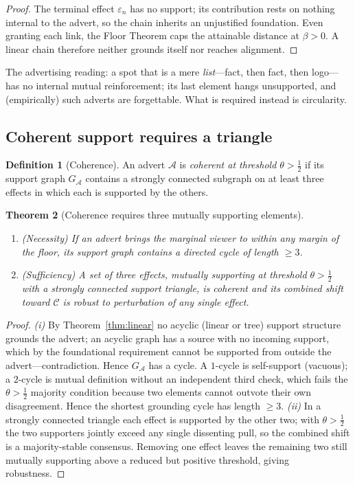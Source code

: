 \documentclass[twocolumn,11pt,a4paper]{article}
\theoremstyle{adv}
\newtheorem{theorem}{Theorem}[section]
\theoremstyle{definition}
\newtheorem{definition}[theorem]{Definition}
\theoremstyle{remark}
\newcommand{\Cell}{\mathcal{C}}        %
\newcommand{\floor}{\beta}            %
\newcommand{\Eff}{\varepsilon}        %
\newcommand{\Adv}{\mathcal{A}}        %
\newcommand{\half}{\tfrac{1}{2}}
\begin{document}
\begin{proof}
The terminal effect $\Eff_n$ has no support; its contribution rests on
nothing internal to the advert, so the chain inherits an unjustified
foundation. Even granting each link, the Floor Theorem caps the attainable
distance at $\floor>0$. A linear chain therefore neither grounds itself nor
reaches alignment.
\end{proof}

The advertising reading: a spot that is a mere \emph{list}---fact, then
fact, then logo---has no internal mutual reinforcement; its last element
hangs unsupported, and (empirically) such adverts are forgettable. What is
required instead is circularity.

\subsection{Coherent support requires a triangle}

\begin{definition}[Coherence]
\label{def:coherence}
An advert $\Adv$ is \emph{coherent at threshold $\theta>\half$} if its
support graph $G_\Adv$ contains a strongly connected subgraph on at least
three effects in which each is supported by the others.
\end{definition}

\begin{theorem}[Coherence requires three mutually supporting elements]
\label{thm:triangle}
\leavevmode
\begin{enumerate}[label=(\roman*),leftmargin=1.8em,itemsep=2pt]
\item \emph{(Necessity)} If an advert brings the marginal viewer to within
  any margin of the floor, its support graph contains a directed cycle of
  length $\ge3$.
\item \emph{(Sufficiency)} A set of three effects, mutually supporting at
  threshold $\theta>\half$ with a strongly connected support triangle, is
  coherent and its combined shift toward $\Cell$ is robust to perturbation
  of any single effect.
\end{enumerate}
\end{theorem}

\begin{proof}
\emph{(i)} By Theorem~\ref{thm:linear} no acyclic (linear or tree) support
structure grounds the advert; an acyclic graph has a source with no
incoming support, which by the foundational requirement cannot be
supported from outside the advert---contradiction. Hence $G_\Adv$ has a
cycle. A $1$-cycle is self-support (vacuous); a $2$-cycle is mutual
definition without an independent third check, which fails the
$\theta>\half$ majority condition because two elements cannot
outvote their own disagreement. Hence the shortest grounding cycle has
length $\ge3$. \emph{(ii)} In a strongly connected triangle each effect is
supported by the other two; with $\theta>\half$ the two supporters
jointly exceed any single dissenting pull, so the combined shift is a
majority-stable consensus. Removing one effect leaves the remaining two
still mutually supporting above a reduced but positive threshold, giving
robustness.
\end{proof}
\end{document}
